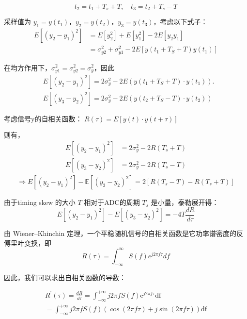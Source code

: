 \documentclass[cs4size,a4paper]{ctexart}
\numberwithin{equation}{section}
\numberwithin{table}{section}
\numberwithin{figure}{section}
\begin{document}
		\[
		t_2 = t_1 + T_s + T,\quad t_3 = t_2 + T_s - T
		\]
		
		采样值为 $y_1 = y(t_1)$，$y_2 = y(t_2)$，$y_3 = y(t_3)$，考虑以下式子：
		\begin{equation}
			\begin{aligned}
				E\left[\left(y_2-y_1\right)^2\right] & =E\left[y_2^2\right]+E\left[y_1^2\right]-2 E\left[y_2 y_1\right] \\
				& =\sigma_{y 2}^2+\sigma_{y 1}^2-2 E\left[y\left(t_1+T_S+T\right) y\left(t_1\right)\right]
			\end{aligned}
		\end{equation}
		
		在均方作用下，$\sigma_{y 1}^2=\sigma_{y 2}^2=\sigma_{y}^2$，因此
		\begin{equation}
			\begin{aligned}
				&E\left[\left(y_2-y_1\right)^2\right]=2 \sigma_y^2-2 E\left(y(t_1+T_S+T) \cdot y(t_1) \right) .\\
				&E\left[\left(y_3-y_2\right)^2\right]=2 \sigma_y^2-2 E\left(y(t_2+T_S-T) \cdot y(t_2)\right)
			\end{aligned}
		\end{equation}
		
		考虑信号y的自相关函数：
		$R(\tau)=E[y(t) \cdot y(t+\tau)]$
		
		则有，
		\begin{align*}
			E[(y_2 - y_1)^2] &= 2\sigma_y^2 - 2R(T_s + T) \\
			E[(y_3 - y_2)^2] &= 2\sigma_y^2 - 2R(T_s - T)
		\end{align*}
		\begin{align*}
			\Rightarrow E[(y_2 - y_1)^2] - \mathbb{E}[(y_3 - y_2)^2] = 2\left[ R(T_s - T) - R(T_s + T) \right]
		\end{align*}
		
		
		
		由于timing skew 的大小 $T$ 相对于ADC的周期 $T_s$ 是小量，泰勒展开得：
		\[
		E[(y_2 - y_1)^2] - E[(y_3 - y_2)^2] = -4T \dfrac{d R}{d \tau}
		\]
		
		由 Wiener–Khinchin 定理，一个平稳随机信号的自相关函数是它功率谱密度的反傅里叶变换，即
		\[
		R(\tau) = \int_{-\infty}^{\infty}   S(f) e^{j2\pi f\tau} df
		\]
		
		因此，我们可以求出自相关函数的导数：
		
		$$
		\begin{gathered}
			R^{\prime}(\tau)=\frac{d R}{d \tau}=\int_{-\infty}^{+\infty} j 2 \pi f S(f) \mathrm{e}^{j 2 \pi f \tau} \mathrm{df} \\
			=\int_{-\infty}^{+\infty} j 2 \pi f S(f)(\cos (2 \pi f \tau)+j \sin (2 \pi f \tau)) \mathrm{df}
		\end{gathered}
		$$
		
\end{document}
